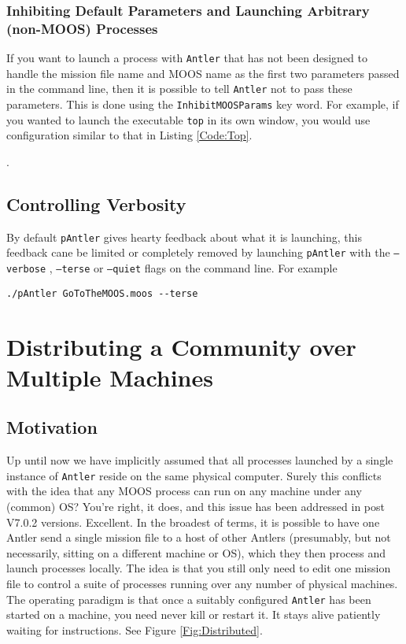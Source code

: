 \documentclass[a4paper,10pt]{article}
\newcommand{\Code}[1]{\texttt{#1} }
\newcommand{\code}[1]{\Code{#1} }
\begin{document}
\subsubsection{Inhibiting Default Parameters and Launching Arbitrary (non-MOOS) Processes}\label{Sec:Inhibit}

If you want to launch a process with \code{Antler} that has not been designed to handle the mission file name and MOOS name as the first two parameters passed in the command line, then it is possible to tell \code{Antler} not to pass these parameters. This is done using the \code{InhibitMOOSParams}  key word. For example, if you wanted to launch the executable \code{top} in its own window, you would use configuration similar to that in Listing \ref{Code:Top}.

.

\subsection{Controlling Verbosity}
By default \code{pAntler} gives hearty feedback about what it is launching, this feedback cane be limited or completely removed by launching \code{pAntler} with the  \code{--verbose}, \code{--terse} or \code{---quiet} flags on the command line. For example


\begin{lstlisting}
./pAntler GoToTheMOOS.moos --terse
\end{lstlisting}



\section{Distributing  a Community over Multiple Machines}

\subsection{Motivation}

Up until now we have implicitly assumed that all processes launched by a single instance of \code{Antler} reside on the same physical computer. Surely this conflicts with the idea that any MOOS process can run on any machine under any (common) OS? You're right, it does, and this issue has been addressed in post V7.0.2 versions. Excellent. In the broadest of terms, it is possible to have one Antler send a single mission file to a host of other Antlers (presumably, but not necessarily, sitting on a different machine or OS), which they then process and launch processes locally. The idea is that you still only need to edit one mission file to control a suite of processes running over any number of physical machines. The operating paradigm is that once a suitably configured \code{Antler} has been started on a machine, you need never kill or restart it. It stays alive patiently waiting for instructions. See Figure \ref{Fig:Distributed}.
\end{document}
